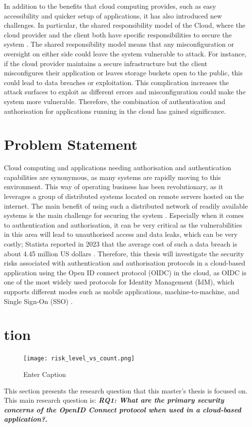 In addition to the benefits that cloud computing provides, such as easy accessibility and quicker setup of applications, it has also introduced new challenges. In particular, the shared responsibility model of the Cloud, where the cloud provider and the client both have specific responsibilities to secure the system \citep{shared_principal}. The shared responsibility model means that any misconfiguration or oversight on either side could leave the system vulnerable to attack. For instance, if the cloud provider maintains a secure infrastructure but the client misconfigures their application or leaves storage buckets open to the public, this could lead to data breaches or exploitation. This complication increases the attack surfaces to exploit as different errors and misconfiguration could make the system more vulnerable. Therefore, the combination of authentication and authorisation for applications running in the cloud has gained significance. 


\section{Problem Statement}
Cloud computing and applications needing authorisation and authentication capabilities are synonymous, as many systems are rapidly moving to this environment. This way of operating business has been revolutionary, as it leverages a group of distributed systems located on remote servers hosted on the internet. The main benefit of using such a distributed network of readily available systems is the main challenge for securing the system \citep{Alouffi2021-yh}. Especially when it comes to authentication and authorisation, it can be very critical as the vulnerabilities in this area will lead to unauthorised access and data leaks, which can be very costly; Statista reported in 2023 that the average cost of such a data breach is about 4.45 million US dollars \citep{statista_data_breach}. Therefore, this thesis will investigate the security risks associated with authentication and authorisation protocols in a cloud-based application using the Open ID connect protocol (OIDC) in the cloud, as OIDC is one of the most widely used protocols for Identity Management (IdM), which supports different modes such as mobile applications, machine-to-machine, and Single Sign-On (SSO) \citep{oidc_popular}.

\section{tion}\label{sec:objectives}
\begin{figure}
    \centering
    \texttt{[image: risk\_level\_vs\_count.png]}
    \caption{Enter Caption}
    \label{fig:enter-label}
\end{figure}
This section presents the research question that this master's thesis is focused on. This main research question is:
\textbf{\textit{RQ1: What are the primary security concerns of the OpenID Connect protocol when used in a cloud-based application?}.}


